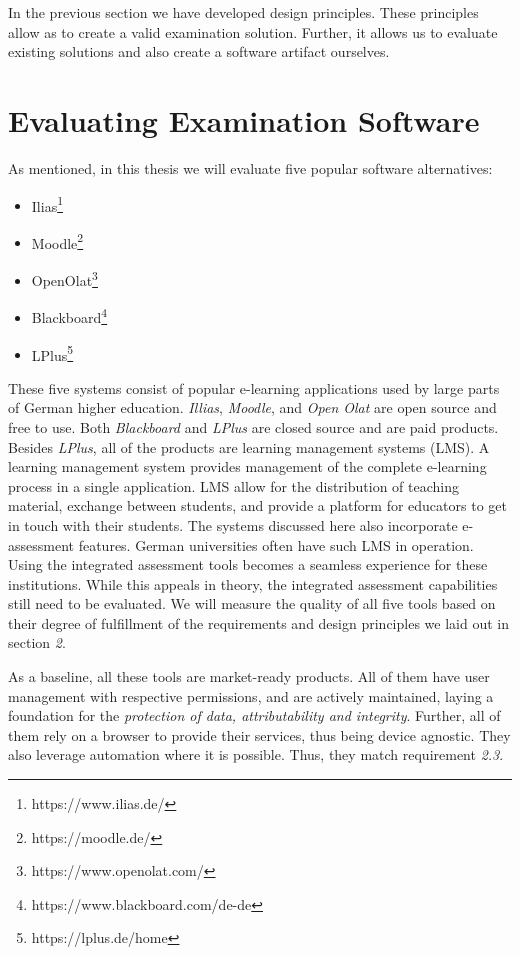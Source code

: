 In the previous section we have developed design principles. These
principles allow as to create a valid examination solution. Further, it
allows us to evaluate existing solutions and also create a software
artifact ourselves.

\newpage

\hypertarget{evaluating-examination-software}{%
\section{Evaluating Examination
Software}\label{evaluating-examination-software}}

As mentioned, in this thesis we will evaluate five popular software
alternatives:

\begin{itemize}
\tightlist
\item
  Ilias\footnote{https://www.ilias.de/}
\item
  Moodle\footnote{https://moodle.de/}
\item
  OpenOlat\footnote{https://www.openolat.com/}
\item
  Blackboard\footnote{https://www.blackboard.com/de-de}
\item
  LPlus\footnote{https://lplus.de/home}
\end{itemize}

These five systems consist of popular e-learning applications used by
large parts of German higher education. \emph{Illias}, \emph{Moodle},
and \emph{Open Olat} are open source and free to use. Both
\emph{Blackboard} and \emph{LPlus} are closed source and are paid
products. Besides \emph{LPlus}, all of the products are learning
management systems (LMS). A learning management system provides
management of the complete e-learning process in a single application.
LMS allow for the distribution of teaching material, exchange between
students, and provide a platform for educators to get in touch with
their students. The systems discussed here also incorporate e-assessment
features. German universities often have such LMS in operation. Using
the integrated assessment tools becomes a seamless experience for these
institutions. While this appeals in theory, the integrated assessment
capabilities still need to be evaluated. We will measure the quality of
all five tools based on their degree of fulfillment of the requirements
and design principles we laid out in section \emph{2}.

As a baseline, all these tools are market-ready products. All of them
have user management with respective permissions, and are actively
maintained, laying a foundation for the \emph{protection of data,
attributability and integrity}. Further, all of them rely on a browser
to provide their services, thus being device agnostic. They also
leverage automation where it is possible. Thus, they match requirement
\emph{2.3}.

